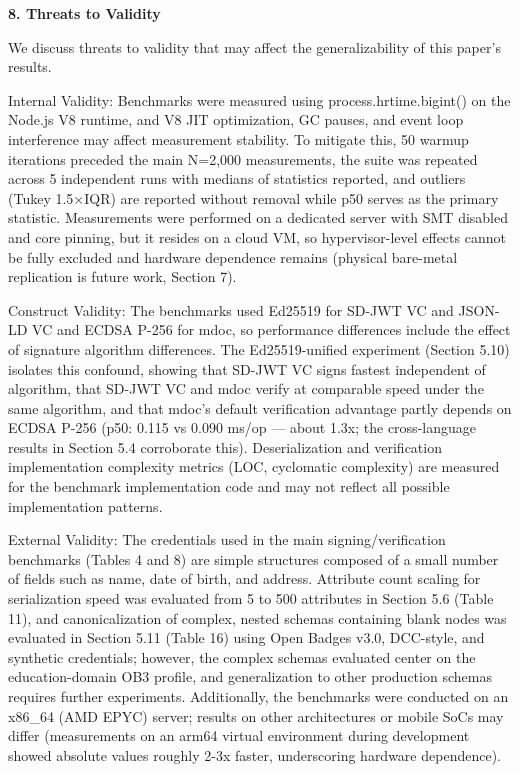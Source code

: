 \textbf{8. Threats to Validity}

We discuss threats to validity that may affect the generalizability of this paper's results.

Internal Validity: Benchmarks were measured using process.hrtime.bigint() on the Node.js V8 runtime, and V8 JIT optimization, GC pauses, and event loop interference may affect measurement stability. To mitigate this, 50 warmup iterations preceded the main N=2,000 measurements, the suite was repeated across 5 independent runs with medians of statistics reported, and outliers (Tukey 1.5×IQR) are reported without removal while p50 serves as the primary statistic. Measurements were performed on a dedicated server with SMT disabled and core pinning, but it resides on a cloud VM, so hypervisor-level effects cannot be fully excluded and hardware dependence remains (physical bare-metal replication is future work, Section 7).

Construct Validity: The benchmarks used Ed25519 for SD-JWT VC and JSON-LD VC and ECDSA P-256 for mdoc, so performance differences include the effect of signature algorithm differences. The Ed25519-unified experiment (Section 5.10) isolates this confound, showing that SD-JWT VC signs fastest independent of algorithm, that SD-JWT VC and mdoc verify at comparable speed under the same algorithm, and that mdoc's default verification advantage partly depends on ECDSA P-256 (p50: 0.115 vs 0.090 ms/op --- about 1.3x; the cross-language results in Section 5.4 corroborate this). Deserialization and verification implementation complexity metrics (LOC, cyclomatic complexity) are measured for the benchmark implementation code and may not reflect all possible implementation patterns.

External Validity: The credentials used in the main signing/verification benchmarks (Tables 4 and 8) are simple structures composed of a small number of fields such as name, date of birth, and address. Attribute count scaling for serialization speed was evaluated from 5 to 500 attributes in Section 5.6 (Table 11), and canonicalization of complex, nested schemas containing blank nodes was evaluated in Section 5.11 (Table 16) using Open Badges v3.0, DCC-style, and synthetic credentials; however, the complex schemas evaluated center on the education-domain OB3 profile, and generalization to other production schemas requires further experiments. Additionally, the benchmarks were conducted on an x86\_64 (AMD EPYC) server; results on other architectures or mobile SoCs may differ (measurements on an arm64 virtual environment during development showed absolute values roughly 2-3x faster, underscoring hardware dependence).


